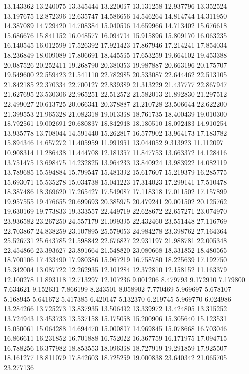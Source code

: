 13.143362
13.240075
13.345444
13.220067
13.131258
12.937796
13.352524
13.197675
12.872396
12.635747
14.586656
14.546264
14.814744
14.311950
14.387089
14.729420
14.708384
15.040506
14.659966
14.713402
15.676618
15.686676
15.841152
16.048577
16.094704
15.915896
15.809170
16.063235
16.140545
16.012599
17.526392
17.921423
17.867946
17.214241
17.854034
18.236849
18.009089
17.806691
18.445565
17.653259
19.664102
19.453388
20.087526
20.252411
19.268790
20.380353
19.987887
20.663196
20.175707
19.549600
22.559423
21.541110
22.782985
20.533087
22.644462
22.513105
21.842185
22.370334
22.700127
22.839389
21.313229
21.437777
22.867947
21.627695
23.530306
22.965251
22.512572
21.582013
21.892830
21.297512
22.499027
20.613725
20.066341
20.378887
21.210728
23.506644
22.622200
21.399553
21.965328
21.082318
19.013368
18.761735
18.400439
19.010300
18.792561
19.002691
20.680837
18.842948
18.180510
18.092483
14.910254
13.935778
13.708044
14.591440
15.262817
16.577902
13.964173
17.183782
15.894346
14.657272
11.405959
11.991961
13.044052
9.313923
11.112097
10.908314
11.286438
11.444708
12.181367
11.847753
13.663372
14.128416
13.751475
13.698475
14.232825
13.964233
13.840924
13.983922
14.082119
13.789685
15.594884
15.799547
15.481392
15.617607
15.219379
16.285775
15.693071
15.535278
15.034738
15.041223
17.314023
17.299141
17.510478
18.387486
18.369620
17.265427
17.549087
17.118318
17.011502
17.157899
19.957555
19.476655
20.699693
20.385975
20.479241
20.001502
20.125762
19.630169
19.773833
19.333557
22.449719
22.628672
22.657271
23.074970
23.936582
23.267250
24.557179
21.099395
22.432460
23.551448
27.116769
22.703867
24.838259
23.107895
25.579053
24.984278
23.398762
27.164364
25.526731
25.643785
21.598842
22.676827
22.931197
21.988781
22.005348
22.454866
23.393627
23.891664
21.548820
23.080668
18.331852
18.480565
18.700106
17.433490
17.980386
15.967219
16.758780
18.225639
17.192750
15.342004
13.087722
12.262935
12.101284
12.372810
12.158152
11.163379
12.100278
11.893118
12.713297
12.107236
9.001206
8.479793
9.172910
7.179800
7.634621
9.152631
7.866199
8.243501
8.058902
7.770469
5.969697
5.678107
5.168945
5.641672
5.417385
6.420147
5.132370
6.219745
5.969770
6.024986
13.284266
13.725273
13.837935
13.506492
13.339972
13.424805
13.315252
13.724943
13.453733
13.537158
15.175058
15.200906
15.305640
15.123531
15.050061
15.064288
14.694470
15.000807
14.969845
15.078668
16.703046
16.866611
16.231852
16.701888
16.752022
16.367759
16.171975
17.094715
16.788256
16.377982
18.853553
18.096368
18.727919
19.291859
17.925507
18.161277
18.811079
17.842603
18.725259
19.000838
23.640342
21.065705
23.277136
